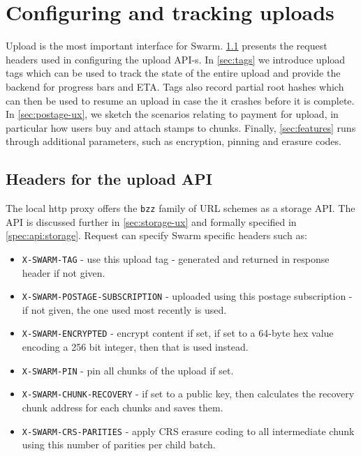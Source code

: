 \section{Configuring and tracking uploads}\label{sec:upload}

\green{}

Upload is the most important interface for Swarm. \ref{sec:headers} presents the request headers used in configuring the upload API-s. In \ref{sec:tags} we introduce upload tags which can be used to track the state of the entire upload and provide the backend for progress bars and ETA. Tags also record partial root hashes which can then be used to resume an upload in case the it crashes before it is complete. In \ref{sec:postage-ux}, we sketch the scenarios relating to payment for upload, in particular how users buy and attach stamps to chunks. Finally, \ref{sec:features} runs through additional parameters, such as encryption, pinning and erasure codes.

\subsection{Headers for the upload API}\label{sec:headers}

The local http proxy offers the \texttt{bzz} family of URL schemes as a storage API. The API is discussed further in \ref{sec:storage-ux} and formally specified in \ref{spec:api:storage}. Request can specify Swarm specific headers such as:

\begin{itemize}
\item \texttt{X-SWARM-TAG} - use this upload tag - generated and returned in response header if not given. 
\item \texttt{X-SWARM-POSTAGE-SUBSCRIPTION} - uploaded using this postage subscription - if not given, the one used most recently is used. 
\item \texttt{X-SWARM-ENCRYPTED} - encrypt content if set, if set to a 64-byte hex value encoding a 256 bit integer, then that is used instead. 
\item \texttt{X-SWARM-PIN} - pin all chunks of the upload if set. 
\item \texttt{X-SWARM-CHUNK-RECOVERY} - if set to a public key, then calculates the recovery chunk address for each chunks and saves them.
\item \texttt{X-SWARM-CRS-PARITIES} - apply CRS erasure coding to all intermediate chunk using this number of parities per child batch.
\end{itemize}


